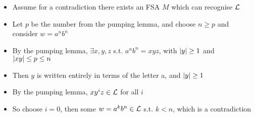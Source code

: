 \begin{itemize}
	\begin{itemize}
		
		\item Assume for a contradiction there exists an FSA $ M $ which can recognise $ \mathcal{L} $
		
		\item Let $ p $ be the number from the pumping lemma, and choose $ n \ge p $ and consider $ w = a^n b^n $

		\item By the pumping lemma, $ \exists x, y, z $ s.t. $ a^n b^n = xyz $, with $ \abs{y} \ge 1 $ and $ \abs{xy} \le p \le n $
		
		\item Then $ y $ is written entirely in terms of the letter a, and $ \abs{y} \ge 1 $
		
		\item By the pumping lemma, $ x y^i z \in \mathcal{L} $ for all $ i $
		
		\item So choose $ i = 0 $, then some $ w = a^k b^n \in \mathcal{L} $ s.t. $ k < n $, which is a contradiction 
		
	\end{itemize}
	
\end{itemize}
